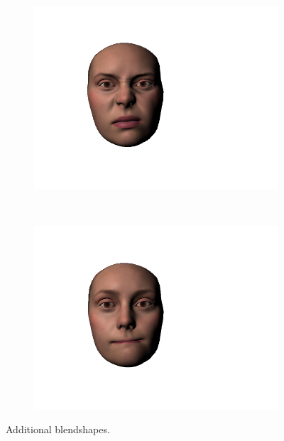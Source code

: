 \begin{figure}[htbp!]
        \begin{subfigure}[b]{0.23\textwidth}
                \includegraphics[trim = 50mm 30mm 80mm 30mm,clip,width=\textwidth]{img/weights/3D/Extrafaces/nosewrinkle2.png}
        \end{subfigure}
        ~ %
        \begin{subfigure}[b]{0.23\textwidth}
                \includegraphics[trim = 50mm 30mm 80mm 30mm,clip,width=\textwidth]{img/weights/3D/Extrafaces/mouthsuck.png}
        \end{subfigure}
        \caption{Additional blendshapes. }\label{fig:extrafaces}
\end{figure}
